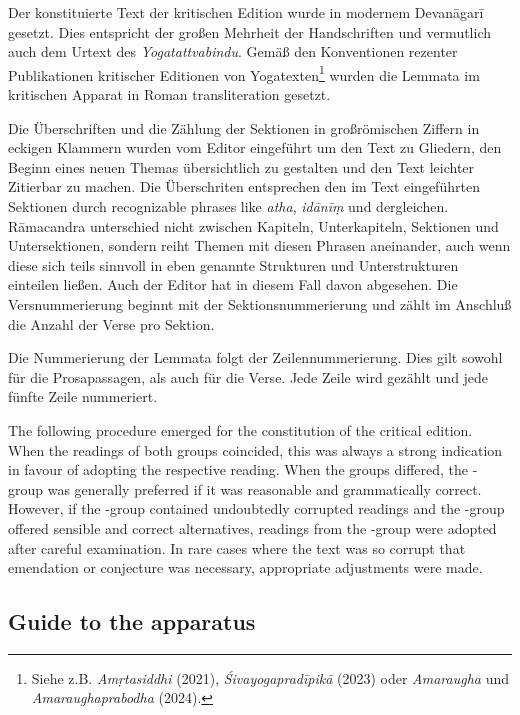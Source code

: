 Der konstituierte Text der kritischen Edition wurde in modernem Devanāgarī gesetzt. Dies entspricht der großen Mehrheit der Handschriften und vermutlich auch dem Urtext des \textit{Yogatattvabindu}. Gemäß den Konventionen rezenter Publikationen kritischer Editionen von Yogatexten\footnote{Siehe z.B. \emph{Amṛtasiddhi} (2021), \emph{Śivayogapradīpikā} (2023) oder \emph{Amaraugha} und \emph{Amaraughaprabodha} (2024).} wurden die Lemmata im kritischen Apparat in Roman transliteration gesetzt.

Die Überschriften und die Zählung der Sektionen in großrömischen Ziffern in eckigen Klammern wurden vom Editor eingeführt um den Text zu Gliedern, den Beginn eines neuen Themas übersichtlich zu gestalten und den Text leichter Zitierbar zu machen. Die Überschriten entsprechen den im Text eingeführten Sektionen durch recognizable phrases like \textit{atha}, \textit{idānīṃ} und dergleichen. Rāmacandra unterschied nicht zwischen Kapiteln, Unterkapiteln, Sektionen und Untersektionen, sondern reiht Themen mit diesen Phrasen aneinander, auch wenn diese sich teils sinnvoll in eben genannte Strukturen und Unterstrukturen einteilen ließen. Auch der Editor hat in diesem Fall davon abgesehen. Die Versnummerierung beginnt mit der Sektionsnummerierung und zählt im Anschluß die Anzahl der Verse pro Sektion.    

Die Nummerierung der Lemmata folgt der Zeilennummerierung. Dies gilt sowohl für die Prosapassagen, als auch für die Verse. Jede Zeile wird gezählt und jede fünfte Zeile nummeriert. 

The following procedure emerged for the constitution of the critical edition. When the readings of both groups coincided, this was always a strong indication in favour of adopting the respective reading. When the groups differed, the \alpha-group was generally preferred if it was reasonable and grammatically correct. However, if the \alpha-group contained undoubtedly corrupted readings and the \beta-group offered sensible and correct alternatives, readings from the \beta-group were adopted after careful examination. In rare cases where the text was so corrupt that emendation or conjecture was necessary, appropriate adjustments were made.

\subsection{Guide to the apparatus}

